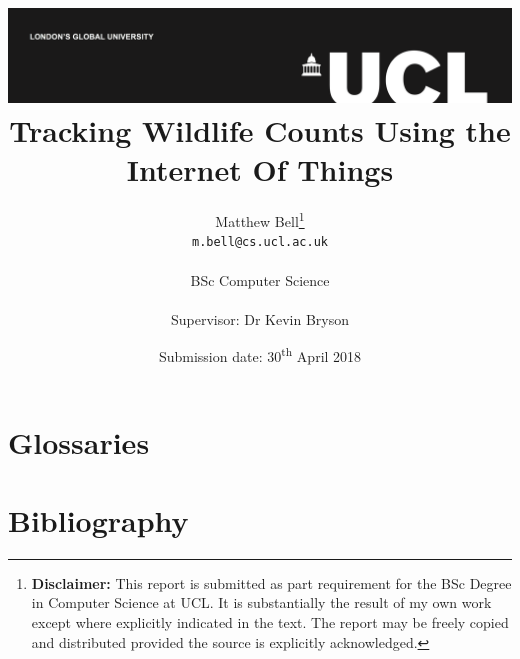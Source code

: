 \documentclass[a4paper]{report}
\title{{\vspace{-14em} \includegraphics[scale=0.4]{ucl_logo.png}}\\
{{\Huge Tracking Wildlife Counts Using the Internet Of Things}}\\
}
\date{Submission date: 30\textsuperscript{th} April 2018}
\author{Matthew Bell\thanks{
{\bf Disclaimer:}
This report is submitted as part requirement for the BSc Degree in Computer
Science at UCL. It is substantially the result of my own work except where
explicitly indicated in the text. The report may be freely copied and
distributed provided the source is explicitly acknowledged.}
\\ 
\texttt{m.bell@cs.ucl.ac.uk}\\ \\
BSc Computer Science\\ \\
Supervisor: Dr Kevin Bryson}
\begin{document}
 
\onehalfspacing
\maketitle
\begin{abstract}
  
\end{abstract}

\setcounter{page}{1}
\tableofcontents







\nocite{*}

\renewcommand{\chaptername}{Appendix}
\appendix

\chapter{Glossaries}
\printglossaries

\chapter{Bibliography}
\printbibliography[heading=bibempty]



\end{document}
